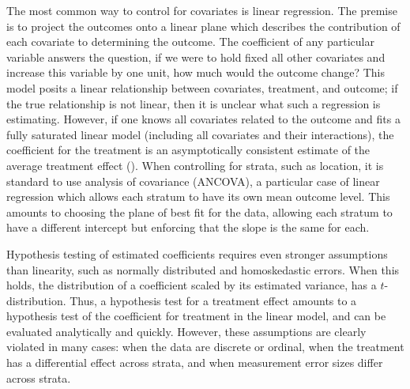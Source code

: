 \documentclass[11pt]{article}
\newcommand{\todo}[1]{{\color{red}{TO DO: \sc #1}}}
\begin{document}
\todo{not happy with this paragraph}
The most common way to control for covariates is linear regression.
The premise is to project the outcomes onto a linear plane which describes the contribution of each covariate to determining the outcome.
The coefficient of any particular variable answers the question, if we were to hold fixed all other covariates and increase this variable by one unit, how much would the outcome change?
This model posits a linear relationship between covariates, treatment, and outcome; if the true relationship is not linear, then it is unclear what such a regression is estimating.
However, if one knows all covariates related to the outcome and fits a fully saturated linear model (including all covariates and their interactions), the coefficient for the treatment is an asymptotically consistent estimate of the average treatment effect (\cite{lin_agnostic_2013}).
When controlling for strata, such as location, it is standard to use analysis of covariance (ANCOVA), a particular case of linear regression which allows each stratum to have its own mean outcome level.
This amounts to choosing the plane of best fit for the data, allowing each stratum to have a different intercept but enforcing that the slope is the same for each.

Hypothesis testing of estimated coefficients requires even stronger assumptions than linearity, such as normally distributed and homoskedastic errors.
When this holds, the distribution of a coefficient scaled by its estimated variance, has a $t$-distribution.
Thus, a hypothesis test for a treatment effect amounts to a hypothesis test of the coefficient for treatment in the linear model, and can be evaluated analytically and quickly.
However, these assumptions are clearly violated in many cases:
when the data are discrete or ordinal, when the treatment has a differential effect across strata, and when measurement error sizes differ across strata.
\end{document}
